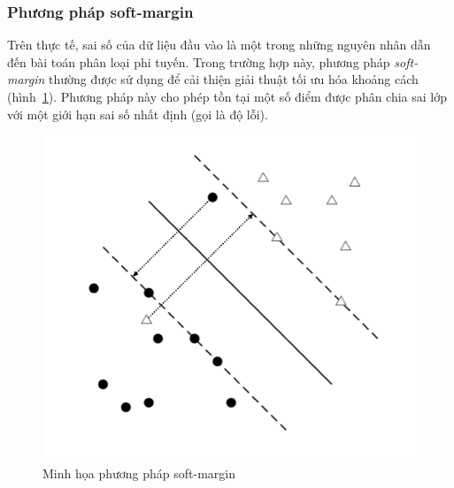 \subsubsection*{Phương pháp soft-margin}
Trên thực tế, sai số của dữ liệu đầu vào là một trong những nguyên nhân dẫn đến bài toán phân loại phi tuyến. Trong trường hợp này, phương pháp \textit{soft-margin} thường được sử dụng để cải thiện giải thuật tối ưu hóa khoảng cách (hình~\ref{fig:softmargin}). Phương pháp này cho phép tồn tại một số điểm được phân chia sai lớp với một giới hạn sai số nhất định (gọi là độ lỗi).
\begin{figure}[h]
\centering
\includegraphics[scale=0.45]{hinh/SVM5.png}
\caption{Minh họa phương pháp soft-margin}
\label{fig:softmargin}
\end{figure}
